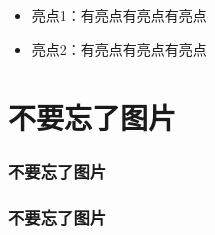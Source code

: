 \documentclass[AutoFakeBold]{beamer}
\begin{document}
{\begin{frame}
        \begin{itemize}
            \item 亮点1：有亮点有亮点有亮点
            \item 亮点2：有亮点有亮点有亮点
        \end{itemize}
    
    \end{frame}

    \section{不要忘了图片}

    \begin{frame}
        \frametitle{不要忘了图片}
    
        \begin{figure}
        \end{figure}
    
    \end{frame}

    \begin{frame}
        \frametitle{不要忘了图片}
    

\end{frame}}
\end{document}
